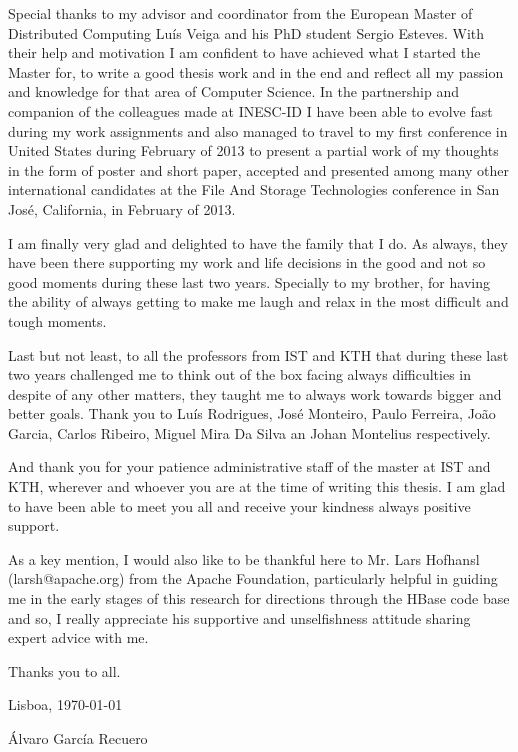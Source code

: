 Special thanks to my advisor and coordinator from the European Master of Distributed Computing Luís Veiga and his PhD student Sergio Esteves. With their help and motivation I am confident to have achieved what I started the Master for, to write a good thesis work and in the end and reflect all my passion and knowledge for that area of Computer Science. In the partnership and companion of the colleagues made at INESC-ID I have been able to evolve fast during my work assignments and also managed to travel to my first conference in United States during February of 2013 to present a partial work of my thoughts in the form of poster and short paper, accepted and presented among many other international candidates at the File And Storage Technologies conference in San José, California, in February of 2013.

I am finally very glad and delighted to have the family that I do. As always, they have been there supporting my work and life decisions in the good and not so good moments during these last two years. Specially to my brother, for having the ability of always getting to make me laugh and relax in the most difficult and tough moments.

Last but not least, to all the professors from IST and KTH that during these last two years challenged me to think out of the box facing always difficulties in despite of any other matters, they taught me to always work towards bigger and better goals. Thank you to Luís Rodrigues, José Monteiro, Paulo Ferreira, João Garcia, Carlos Ribeiro, Miguel Mira Da Silva an Johan Montelius respectively. 

And thank you for your patience administrative staff of the master at IST and KTH, wherever and whoever you are at the time of writing this thesis. I am glad to have been able to meet you all and receive your kindness always positive support.

As a key mention, I would also like to be thankful here to Mr. Lars Hofhansl (larsh@apache.org) from the Apache Foundation, particularly helpful in guiding me in the early stages of this research for directions through the HBase code base and so, I really appreciate his supportive and unselfishness attitude sharing expert advice with me.

Thanks you to all.
\vfill
\begin{flushright}
  \begin{minipage}{8cm}
    \begin{center}
      Lisboa, \today

      Álvaro García Recuero
    \end{center}
  \end{minipage}
\end{flushright}

